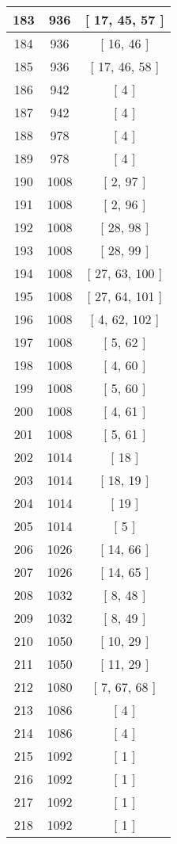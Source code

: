 \begin{center}
\begin{longtable}[H]{|| c c c ||}
\hline
183 & 936 & [ 17, 45, 57 ] \\ 
\hline
184 & 936 & [ 16, 46 ] \\ 
\hline
185 & 936 & [ 17, 46, 58 ] \\ 
\hline
186 & 942 & [ 4 ] \\ 
\hline
187 & 942 & [ 4 ] \\ 
\hline
188 & 978 & [ 4 ] \\ 
\hline
189 & 978 & [ 4 ] \\ 
\hline
190 & 1008 & [ 2, 97 ] \\ 
\hline
191 & 1008 & [ 2, 96 ] \\ 
\hline
192 & 1008 & [ 28, 98 ] \\ 
\hline
193 & 1008 & [ 28, 99 ] \\ 
\hline
194 & 1008 & [ 27, 63, 100 ] \\ 
\hline
195 & 1008 & [ 27, 64, 101 ] \\ 
\hline
196 & 1008 & [ 4, 62, 102 ] \\ 
\hline
197 & 1008 & [ 5, 62 ] \\ 
\hline
198 & 1008 & [ 4, 60 ] \\ 
\hline
199 & 1008 & [ 5, 60 ] \\ 
\hline
200 & 1008 & [ 4, 61 ] \\ 
\hline
201 & 1008 & [ 5, 61 ] \\ 
\hline
202 & 1014 & [ 18 ] \\ 
\hline
203 & 1014 & [ 18, 19 ] \\ 
\hline
204 & 1014 & [ 19 ] \\ 
\hline
205 & 1014 & [ 5 ] \\ 
\hline
206 & 1026 & [ 14, 66 ] \\ 
\hline
207 & 1026 & [ 14, 65 ] \\ 
\hline
208 & 1032 & [ 8, 48 ] \\ 
\hline
209 & 1032 & [ 8, 49 ] \\ 
\hline
210 & 1050 & [ 10, 29 ] \\ 
\hline
211 & 1050 & [ 11, 29 ] \\ 
\hline
212 & 1080 & [ 7, 67, 68 ] \\ 
\hline
213 & 1086 & [ 4 ] \\ 
\hline
214 & 1086 & [ 4 ] \\ 
\hline
215 & 1092 & [ 1 ] \\ 
\hline
216 & 1092 & [ 1 ] \\ 
\hline
217 & 1092 & [ 1 ] \\ 
\hline
218 & 1092 & [ 1 ] \\ 

\end{longtable}
\end{center}
